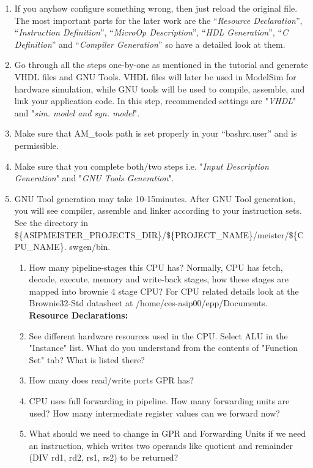 \begin{enumerate}
\begin{enumerate}
	\item If you anyhow configure something wrong, then just reload the original file. The most important parts for the later work are the ``\emph{Resource Declaration}'', ``\emph{Instruction Definition}'', 	``\emph{MicroOp Description}'', ``\emph{HDL Generation}'', ``\emph{C Definition}'' and ``\emph{Compiler Generation}'' so have a detailed look at them.
	\item Go through all the steps one-by-one as mentioned in the tutorial and
	generate VHDL files and GNU Tools. VHDL files will later be used in ModelSim for hardware simulation, while GNU tools will be used to compile, assemble, and link your application code. In this step, recommended settings are "\emph{VHDL}" and "\emph{sim. model and syn. model}".
	\item Make sure that AM\_tools path is set properly in your ``bashrc.user'' and is permissible.
	\item Make sure that you complete both/two steps i.e. "\emph{Input Description Generation}" and "\emph{GNU Tools Generation}".
	\item GNU Tool generation may take 10-15minutes. After GNU Tool generation, you will see compiler, assemble and linker according to your instruction sets. See the directory in \$\{ASIPMEISTER\_PROJECTS\_DIR\}/\$\{PROJECT\_NAME\}/meister/\$\{CPU\_NAME\}.
	swgen/bin.
		\begin{enumerate}[label=(\alph*)]
		\color{red}\item\normalcolor How many pipeline-stages this CPU has? Normally, CPU has fetch, decode, execute, memory and write-back stages, how these stages are mapped into brownie 4 stage CPU? For CPU related details look at the Brownie32-Std datasheet at /home/ces-asip00/epp/Documents.
		\newline\textbf{Resource Declarations:}
		\color{red}\item\normalcolor  See different hardware resources used in the CPU. Select ALU in the "Instance" list. What do you understand from the contents of "Function Set" tab? What is listed there?
		\color{red}\item\normalcolor  How many does read/write ports GPR has?
		\color{red}\item\normalcolor  CPU uses full forwarding in pipeline. How many forwarding units are used? How many intermediate register values can we forward now?
		\color{red}\item\normalcolor  What should we need to change in GPR and Forwarding Units if we need an instruction, which writes two operands like quotient and remainder (DIV rd1, rd2, rs1, rs2) to be returned?

\end{enumerate}
\end{enumerate}
\end{enumerate}
